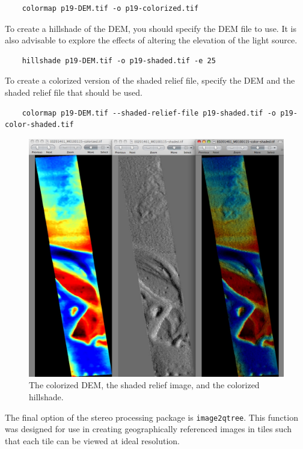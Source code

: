 \begin{verbatim}
    colormap p19-DEM.tif -o p19-colorized.tif
\end{verbatim}

To create a hillshade of the DEM, you should specify the DEM file
to use. It is also advisable to explore the effects of altering the
elevation of the light source.

\begin{verbatim}
    hillshade p19-DEM.tif -o p19-shaded.tif -e 25
\end{verbatim}

To create a colorized version of the shaded relief file, specify
the DEM and the shaded relief file that should be used.

\begin{verbatim}
    colormap p19-DEM.tif --shaded-relief-file p19-shaded.tif -o p19-color-shaded.tif
\end{verbatim}

\begin{figure}
\begin{center}
\includegraphics[width=5in]{images/p19-colorized-shaded.png}
\caption[P19 colorized and shaded relief]{
    \label{p19-color}
	The colorized DEM, the shaded relief image, and the colorized hillshade.
    }
\end{center}
\end{figure}

The final option of the stereo processing package is \texttt{image2qtree}.
This function was designed for use in creating geographically
referenced images in tiles such that each tile can be viewed at
ideal resolution.

